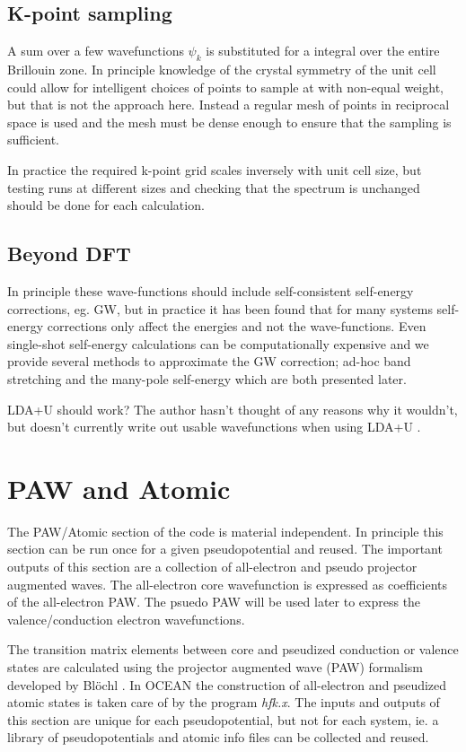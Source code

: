 \documentclass[11pt]{report}
\begin{document}
\section{K-point sampling}

A sum over a few wavefunctions $\psi_k$ is substituted for a integral over the entire Brillouin zone. In principle knowledge of the crystal symmetry of the unit cell could allow for intelligent choices of  points to sample at with non-equal weight, but that is not the approach here. Instead a regular mesh of points in reciprocal space is used and the mesh must be dense enough to ensure that the sampling is sufficient. 

In practice the required k-point grid scales inversely with unit cell size, but testing runs at different sizes and checking that the spectrum is unchanged should be done for each calculation.

\section{Beyond DFT}

In principle these wave-functions should include self-consistent self-energy corrections, eg. GW, but in practice it has been found that for many systems 
self-energy corrections only affect the energies and not the wave-functions. Even single-shot self-energy calculations can be computationally expensive 
and we provide several methods to approximate the GW correction; ad-hoc band stretching and the many-pole self-energy which are both presented 
later.

LDA+U should work? The author hasn't thought of any reasons why it wouldn't, but  doesn't currently write out usable wavefunctions when using LDA+U .


\chapter{PAW and Atomic}

The PAW/Atomic section of the code is material independent. In principle this section can be run once
for a given pseudopotential and reused. The important outputs of this section are a collection of 
all-electron and pseudo projector augmented waves. The all-electron core wavefunction is expressed
as coefficients of the all-electron PAW. The psuedo PAW will be used later to express the valence/conduction
electron wavefunctions.

The transition matrix elements between core and pseudized conduction or valence states are calculated 
using the projector augmented wave (PAW) formalism developed by Bl\"{o}chl \cite{Bloechl}. In OCEAN
the construction of all-electron and pseudized atomic states is taken care of by the program \emph{hfk.x}. 
The inputs and outputs of this section are unique for each pseudopotential, but not for each system, ie. 
a library of pseudopotentials and atomic info files can be collected and reused.
\end{document}
